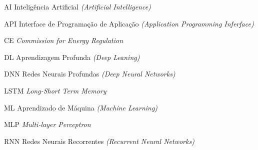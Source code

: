 \documentclass[
	12pt,				%
	oneside,			%
	a4paper,			%
	english,			%
	brazil				%
	]{abntex2}
\newcommand{\listofquadrosname}{Lista de quadros}
\begin{document}

\listoftables*
\cleardoublepage

\begin{siglas}
	\item[AI] Inteligência Artificial \textit{(Artificial Intelligence)}
	\item[API] Interface de Programação de Aplicação \textit{(Application Programming Inferface)}
	\item[CE] \textit{Commission for Energy Regulation }
	\item[DL] Aprendizagem Profunda \textit{(Deep Leaning)}
	\item[DNN] Redes Neurais Profundas \textit{(Deep Neural Networks)}
	\item[LSTM] \textit{Long-Short Term Memory}
	\item[ML] Aprendizado de Máquina \textit{(Machine Learning)}
	\item[MLP]  \textit{Multi-layer Perceptron}
	\item[RNN] Redes Neurais Recorrentes \textit{(Recurrent Neural Networks)}
\end{siglas}


\tableofcontents*
\clearpage



\textual

\end{document}
